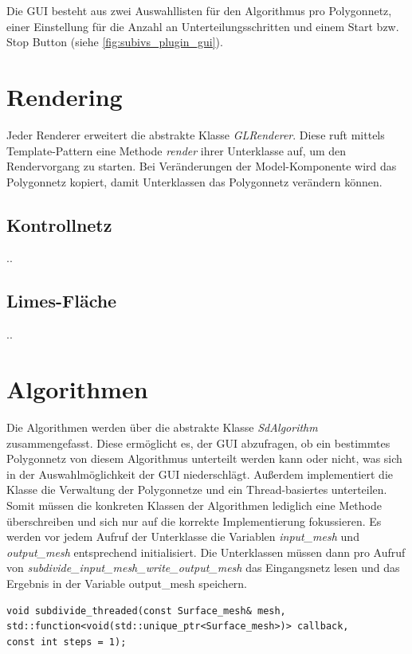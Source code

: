 Die GUI besteht aus zwei Auswahllisten für den Algorithmus pro Polygonnetz, einer Einstellung für die Anzahl an Unterteilungsschritten und einem Start bzw. Stop Button (siehe \autoref{fig:subivs_plugin_gui}).

\section{Rendering}

Jeder Renderer erweitert die abstrakte Klasse \emph{GLRenderer}. 
Diese ruft mittels Template-Pattern eine Methode \emph{render} ihrer Unterklasse auf, um den Rendervorgang zu starten.
Bei Veränderungen der Model-Komponente wird das Polygonnetz kopiert, damit Unterklassen das Polygonnetz verändern können.

\subsection{Kontrollnetz}
..


\subsection{Limes-Fläche}
..

\section{Algorithmen}

Die Algorithmen werden über die abstrakte Klasse \emph{SdAlgorithm} zusammengefasst. 
Diese ermöglicht es, der GUI abzufragen, ob ein bestimmtes Polygonnetz von diesem Algorithmus unterteilt werden kann oder nicht, was sich in der Auswahlmöglichkeit der GUI niederschlägt.
Außerdem implementiert die Klasse die Verwaltung der Polygonnetze und ein Thread-basiertes unterteilen. 
Somit müssen die konkreten Klassen der Algorithmen lediglich eine Methode überschreiben und sich nur auf die korrekte Implementierung fokussieren.
Es werden vor jedem Aufruf der Unterklasse die Variablen \emph{input\_mesh} und \emph{output\_mesh} entsprechend initialisiert.
Die Unterklassen müssen dann pro Aufruf von \emph{subdivide\_input\_mesh\_write\_output\_mesh} das Eingangsnetz lesen und das Ergebnis in der Variable output\_mesh speichern.

\begin{lstlisting}[style=myCppStyle, caption={Signatur der Unterteilungsfunktion}, label=lst:subdiv_threaded]
void subdivide_threaded(const Surface_mesh& mesh, 
std::function<void(std::unique_ptr<Surface_mesh>)> callback, 
const int steps = 1);
\end{lstlisting}

